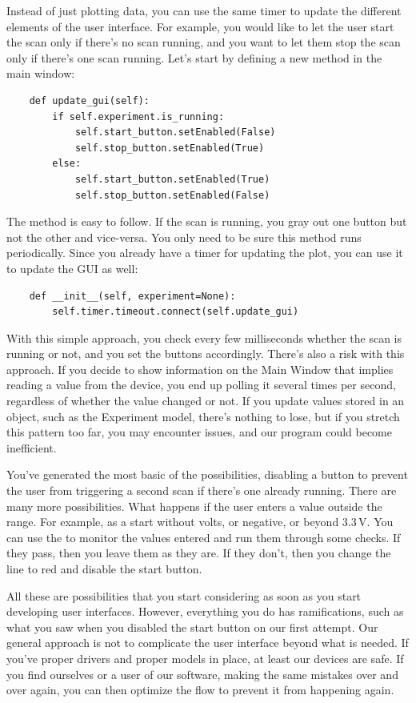 Instead of just plotting data, you can use the same timer to update the different elements of the user interface. For example, you would like to let the user start the scan only if there's no scan running, and you want to let them stop the scan only if there's one scan running. Let's start by defining a new method in the main window:

\begin{verbatim}
    def update_gui(self):
        if self.experiment.is_running:
            self.start_button.setEnabled(False)
            self.stop_button.setEnabled(True)
        else:
            self.start_button.setEnabled(True)
            self.stop_button.setEnabled(False)
\end{verbatim}

The method  is easy to follow. If the scan is running, you gray out one button but not the other and vice-versa. You only need to be sure this method runs periodically. Since you already have a timer for updating the plot, you can use it to update the GUI as well:

\begin{verbatim}
    def __init__(self, experiment=None):
        self.timer.timeout.connect(self.update_gui)
\end{verbatim}

With this simple approach, you check every few milliseconds whether the scan is running or not, and you set the buttons accordingly. There's also a risk with this approach. If you decide to show information on the Main Window that implies reading a value from the device, you end up polling it several times per second, regardless of whether the value changed or not. If you update values stored in an object, such as the Experiment model, there's nothing to lose, but if you stretch this pattern too far, you may encounter issues, and our program could become inefficient.

You've generated the most basic of the possibilities, disabling a button to prevent the user from triggering a second scan if there's one already running. There are many more possibilities. What happens if the user enters a value outside the range. For example, as a start without volts, or negative, or beyond $3.3\,\textrm{V}$. You can use the  to monitor the values entered and run them through some checks. If they pass, then you leave them as they are. If they don't, then you change the line to red and disable the start button.

All these are possibilities that you start considering as soon as you start developing user interfaces. However, everything you do has ramifications, such as what you saw when you disabled the start button on our first attempt. Our general approach is not to complicate the user interface beyond what is needed. If you've proper drivers and proper models in place, at least our devices are safe. If you find ourselves or a user of our software, making the same mistakes over and over again, you can then optimize the flow to prevent it from happening again.

